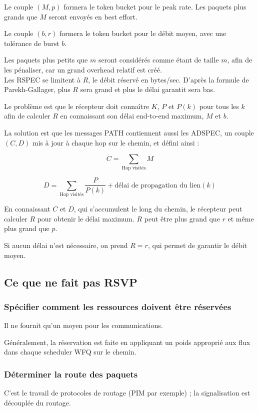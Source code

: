 			Le couple $(M, p)$ formera le token bucket pour le peak rate. Les paquets plus grands que $M$ seront envoyés en best effort.
			
			Le couple $(b, r)$ formera le token bucket pour le débit moyen, avec une tolérance de burst $b$.
			
			Les paquets plus petits que $m$ seront considérés comme étant de taille $m$, afin de les pénaliser, car un grand overhead relatif est créé. \\
			
			Les RSPEC se limitent à $R$, le débit réservé en bytes/sec. D'après la formule de Parekh-Gallager, plus $R$ sera grand et plus le délai garantit sera bas.
		
			Le problème est que le récepteur doit connaître $K$, $P$ et $P(k)$ pour tous les $k$ afin de calculer $R$ en connaissant son délai end-to-end maximum, $M$ et $b$.
			
			La solution est que les messages PATH contiennent aussi les ADSPEC, un couple $(C, D)$ mis à jour à chaque hop sur le chemin, et défini ainsi :
			
			$$C = \sum_{\text{Hop visités}} M$$
			
			$$D = \sum_{\text{Hop visités}} \frac{P}{P(k)} + \text{délai de propagation du lien}(k)$$
			
			En connaissant $C$ et $D$, qui s'accumulent le long du chemin, le récepteur peut calculer $R$ pour obtenir le délai maximum. $R$ peut être plus grand que $r$ et même plus grand que $p$.
			
			Si aucun délai n'est nécessaire, on prend $R = r$, qui permet de garantir le débit moyen.
			
			\subsection{Ce que ne fait pas RSVP}
		
			\subsubsection{Spécifier comment les ressources doivent être réservées} Il ne fournit qu'un moyen pour les communications.
			
			Généralement, la réservation est faite en appliquant un poids approprié aux flux dans chaque scheduler WFQ sur le chemin.
			
			\subsubsection{Déterminer la route des paquets} C'est le travail de protocoles de routage (PIM par exemple) ; la signalisation est découplée du routage.
			
